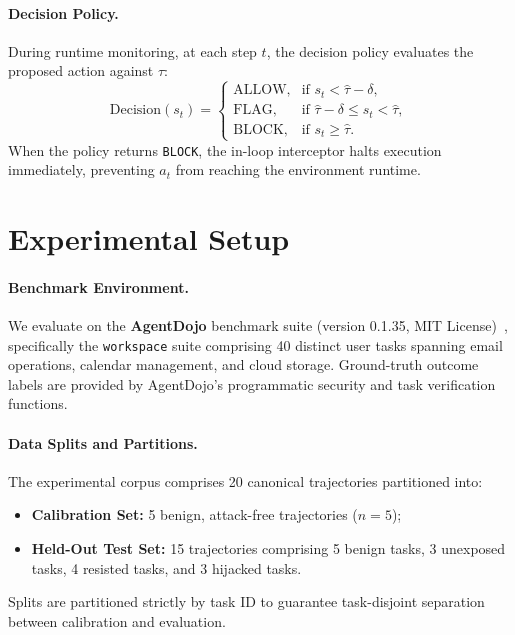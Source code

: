 \documentclass[11pt,a4paper]{article}
\begin{document}
\paragraph{Decision Policy.}
During runtime monitoring, at each step $t$, the decision policy evaluates the proposed action against $\hat{\tau}$:
\begin{equation}
    \text{Decision}(s_t) = 
    \begin{cases}
        \text{ALLOW}, & \text{if } s_t < \hat{\tau} - \delta, \\
        \text{FLAG},  & \text{if } \hat{\tau} - \delta \le s_t < \hat{\tau}, \\
        \text{BLOCK}, & \text{if } s_t \ge \hat{\tau}.
    \end{cases}
\end{equation}
When the policy returns \texttt{BLOCK}, the in-loop interceptor halts execution immediately, preventing $a_t$ from reaching the environment runtime.

\section{Experimental Setup}
\label{sec:setup}

\paragraph{Benchmark Environment.}
We evaluate on the \textbf{AgentDojo} benchmark suite (version 0.1.35, MIT License)~\cite{debenedetti2024agentdojo}, specifically the \texttt{workspace} suite comprising 40 distinct user tasks spanning email operations, calendar management, and cloud storage. Ground-truth outcome labels are provided by AgentDojo's programmatic security and task verification functions.

\paragraph{Data Splits and Partitions.}
The experimental corpus comprises 20 canonical trajectories partitioned into:
\begin{itemize}
    \item \textbf{Calibration Set:} 5 benign, attack-free trajectories ($n = 5$);
    \item \textbf{Held-Out Test Set:} 15 trajectories comprising 5 benign tasks, 3 unexposed tasks, 4 resisted tasks, and 3 hijacked tasks.
\end{itemize}
Splits are partitioned strictly by task ID to guarantee task-disjoint separation between calibration and evaluation.
\end{document}

